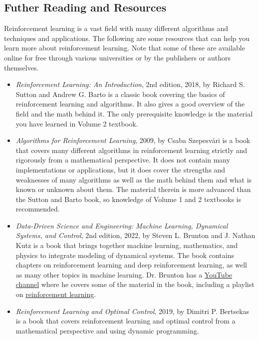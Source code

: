 \subsection*{Futher Reading and Resources}
Reinforcement learning is a vast field with many different algorithms and techniques and applications.
The following are some resources that can help you learn more about reinforcement learning.
Note that some of these are available online for free through various universities or by the publishers or authors themselves.
\begin{itemize}
    \item \emph{Reinforcement Learning: An Introduction}, 2nd edition, 2018, by Richard S. Sutton and Andrew G. Barto is a classic book covering the basics of reinforcement learning and algorithms.
    It also gives a good overview of the field and the math behind it.
    The only prerequisite knowledge is the material you have learned in Volume 2 textbook.
    \item \emph{Algorithms for Reinforcement Learning}, 2009, by Csaba Szepesvári is a book that covers many different algorithms in reinforcement learning strictly and rigorously from a mathematical perspective.
    It does not contain many implementations or applications, but it does cover the strengths and weaknesses of many algorithms as well as the math behind them and what is known or unknown about them.
    The material therein is more advanced than the Sutton and Barto book, so knowledge of Volume 1 and 2 textbooks is recommended.
    \item \emph{Data-Driven Science and Engineering: Machine Learning, Dynamical Systems, and Control}, 2nd edition, 2022, by Steven L. Brunton and J. Nathan Kutz is a book that brings together machine learning, mathematics, and physics to integrate modeling of dynamical systems.
    The book contains chapters on reinforcement learning and deep reinforcement learning, as well as many other topics in machine learning.
    Dr. Brunton has a \href{https://www.youtube.com/@Eigensteve}{YouTube channel} where he covers some of the material in the book, including a playlist on \href{https://www.youtube.com/watch?v=0MNVhXEX9to&list=PLMrJAkhIeNNQe1JXNvaFvURxGY4gE9k74}{reinforcement learning}.
    \item \emph{Reinforcement Learning and Optimal Control}, 2019, by Dimitri P. Bertsekas is a book that covers reinforcement learning and optimal control from a mathematical perspective and using dynamic programming.


\end{itemize}


